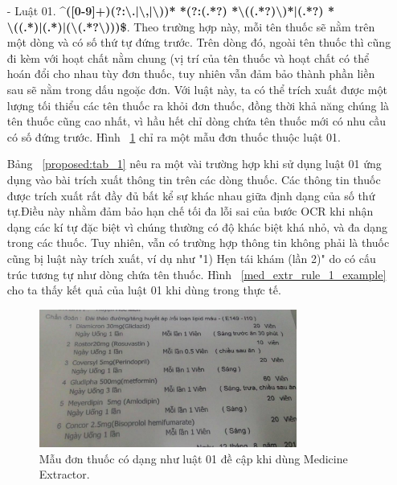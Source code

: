 \begin{itemize}

\item[-] Luật 01. \textbf{^([0-9]+)(?:\textbackslash.|\textbackslash,|\textbackslash))* *(?:(.*?) *\textbackslash((.*?)\textbackslash)*|(.*?) *\\\textbackslash((.*)|(.*)|(\textbackslash(.*?\textbackslash)))\$}. Theo trường hợp này, mỗi tên thuốc sẽ nằm trên một dòng và có số thứ tự đứng trước. Trên dòng đó, ngoài tên thuốc thì cũng đi kèm với hoạt chất nằm chung (vị trí của tên thuốc và hoạt chất có thể hoán đổi cho nhau tùy đơn thuốc, tuy nhiên vẫn đảm bảo thành phần liền sau sẽ nằm trong dấu ngoặc đơn. Với luật này, ta có thể trích xuất được một lượng tối thiểu các tên thuốc ra khỏi đơn thuốc, đồng thời khả năng chúng là tên thuốc cũng cao nhất, vì hầu hết chỉ dòng chứa tên thuốc mới có nhu cầu có số đứng trước. Hình ~\ref{med_extr_rule_1} chỉ ra một mẫu đơn thuốc thuộc luật 01.

Bảng ~\ref{proposed:tab_1} nêu ra một vài trường hợp khi sử dụng luật 01 ứng dụng vào bài trích xuất thông tin trên các dòng thuốc. Các thông tin thuốc được trích xuất rất đầy đủ bất kể sự khác nhau giữa định dạng của số thứ tự.Điều này nhằm đảm bảo hạn chế tối đa lỗi sai của bước OCR khi nhận dạng các kí tự đặc biệt vì chúng thường có độ khác biệt khá nhỏ, và đa dạng trong các thuốc. Tuy nhiên, vẫn có trường hợp thông tin không phải là thuốc cũng bị luật này 
trích xuất, ví dụ như "1) Hẹn tái khám (lần 2)" do có cấu trúc tương tự như dòng chứa tên thuốc. Hình ~\ref{med_extr_rule_1_example} cho ta thấy kết quả của luật 01 khi dùng trong thực tế.

\begin{figure}
\centering
\includegraphics[width=0.8\textwidth]{mep_img/med_extr_rule_1.png}
\caption{Mẫu đơn thuốc có dạng như luật 01 đề cập khi dùng Medicine Extractor.}\label{med_extr_rule_1}
\end{figure}


\end{itemize}
